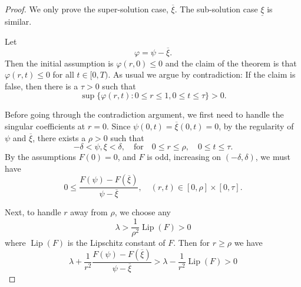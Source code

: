 \documentclass{amsart}
\begin{document}
\begin{proof}
We only prove the super-solution case, \(\overline{\xi}\). The sub-solution case \(\underline{\xi}\) is similar.

Let
\[
\varphi = \psi - \overline{\xi}.
\]
Then the initial assumption is \(\varphi(r, 0) \leq 0\) and the claim of the theorem is that \(\varphi(r, t) \leq 0\) for all \(t \in [0, T)\). As usual we argue by contradiction: If the claim is false, then there is a \(\tau > 0\) such that
\begin{equation}
\label{eq:false_claim}
\sup \{\varphi(r, t) : 0 \leq r \leq 1, 0 \leq t \leq \tau\} > 0.
\end{equation}

Before going through the contradiction argument, we first need to handle the singular coefficients at \(r = 0\). Since \(\psi(0, t) = \overline{\xi}(0, t) = 0\), by the regularity of \(\psi\) and \(\overline{\xi}\), there exists a \(\rho > 0\) such that
\[
-\delta < \psi, \xi < \delta, \quad \text{for} \quad 0 \leq r \leq \rho, \quad 0 \leq t \leq \tau.
\]
By the assumptions \(F(0) = 0\), and \(F\) is odd, increasing on \((-\delta,\delta)\), we must have
\begin{equation}
\label{eq:near_positive}
0 \leq \frac{F(\psi) - F(\overline{\xi})}{\psi - \overline{\xi}}, \quad (r, t) \in [0, \rho] \times [0, \tau].
\end{equation}

Next, to handle \(r\) away from \(\rho\), we choose any
\[
\lambda > \frac{1}{\rho^2} \operatorname{Lip} (F) > 0
\]
where \(\operatorname{Lip} (F)\) is the Lipschitz constant of \(F\). Then for  \(r \geq \rho\) we have
\begin{equation}
\label{eq:far_positive}
\lambda + \frac{1}{r^2} \frac{F(\psi) - F(\overline{\xi})}{\psi - \overline{\xi}} > \lambda - \frac{1}{r^2} \operatorname{Lip} (F) > 0
\end{equation}


\end{proof}
\end{document}
